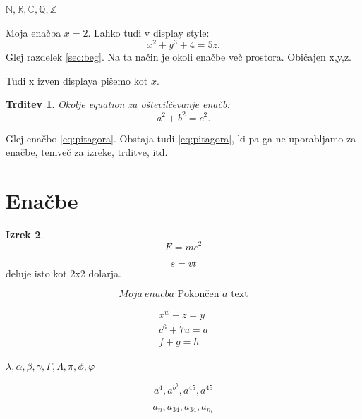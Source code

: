 \documentclass[11pt,a4paper]{article}
\newcommand{\R}{\mathbb R}
\newcommand{\N}{\mathbb N}
\newcommand{\Z}{\mathbb Z}
\newcommand{\C}{\mathbb C}
\newcommand{\Q}{\mathbb Q}
\theoremstyle{plain}
\theoremstyle{definition}
\theoremstyle{plain}
\newtheorem{izrek}{Izrek}[section]
\newtheorem{trditev}[izrek]{Trditev}
\theoremstyle{definition}
\begin{document}
	$\N, \R, \C, \Q,\Z$
	
	
	Moja enačba $x=2.$ Lahko tudi v display style:
	$$
	x^2+y^3+4 = 5z.
	$$
	Glej razdelek \ref{sec:beg}.
	Na ta način je okoli enačbe več prostora. Običajen x,y,z. 
	
	Tudi x izven displaya pišemo kot $x.$
	
	\begin{trditev}
			Okolje equation za oštevilčevanje enačb:
		\begin{equation}\label{eq:pitagora}
			a^2+b^2=c^2.
		\end{equation}
	\end{trditev}
	

	
Glej enačbo \eqref{eq:pitagora}. Obstaja tudi \ref{eq:pitagora}, ki pa ga ne uporabljamo za enačbe, temveč za izreke, trditve, itd.

\section{Enačbe}

\begin{izrek}
\begin{equation} \tag{Einstein}
	E =mc^2
\end{equation}
\end{izrek}



\begin{equation*}
	s = vt
\end{equation*}
deluje isto kot 2x2 dolarja.	

$$
Moja \  enacba \text{ Pokončen $a$ text}
$$


\begin{align*}
	x^w+z=y \\
	c^6+7u=a\\
	f+g=h
\end{align*}
	
	
	$\lambda, \alpha, \beta, \gamma, \Gamma, \Lambda, \pi, \phi, \varphi$
	
	
	$$
	a^4, a^{b^5}, a^45, a^{45}
	$$
	
	$$
	a_n, a_34, a_{34}, a_{n_k}
	$$
	
\end{document}
